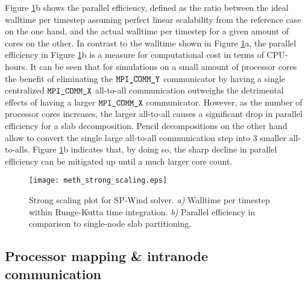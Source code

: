 \documentclass[]{article}
\begin{document}
Figure \ref{fig:strongscaling}b shows the parallel efficiency, defined as the ratio between the ideal walltime per timestep assuming perfect linear scalability from the reference case on the one hand, and the actual walltime per timestep for a given amount of cores on the other. In contrast to the walltime shown in Figure \ref{fig:strongscaling}a, the parallel efficiency in Figure \ref{fig:strongscaling}b is a measure for computational cost in terms of CPU-hours. It can be seen that for simulations on a small amount of processor cores the benefit of eliminating the $\verb|MPI_COMM_Y|$ communicator by having a single centralized $\verb|MPI_COMM_X|$ all-to-all communication outweighs the detrimental effects of having a larger $\verb|MPI_COMM_X|$ communicator. However, as the number of processor cores increases, the larger all-to-all causes a significant drop in parallel efficiency for a slab decomposition. Pencil decompositions on the other hand allow to convert the single large all-to-all communication step into 3 smaller all-to-alls. Figure \ref{fig:strongscaling}b indicates that, by doing so, the sharp decline in parallel efficiency can be mitigated up until a much larger core count. 

\begin{figure}
\texttt{[image: meth\_strong\_scaling.eps]}
\caption{Strong scaling plot for SP-Wind solver. \emph{a)} Walltime per timestep within Runge-Kutta time integration. \emph{b)} Parallel efficiency in comparison to single-node slab partitioning. \label{fig:strongscaling}}
\end{figure}
\subsection{Processor mapping \& intranode communication}
\end{document}
